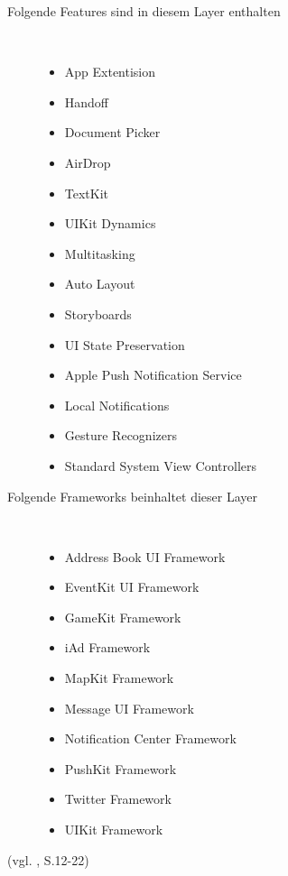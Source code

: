 \begin{description}
\item[Folgende Features sind in diesem Layer enthalten]~\par
	\begin{multicols}{2}
	\begin{itemize}
		\item App Extentision
		\item Handoff
		\item Document Picker
		\item AirDrop
		\item TextKit
		\item UIKit Dynamics
		\item Multitasking
		\item Auto Layout
		\item Storyboards
		\item UI State Preservation
		\item Apple Push Notification Service
		\item Local Notifications
		\item Gesture Recognizers
		\item Standard System View Controllers
         \end{itemize}
	\end{multicols}
\end{description}

\begin{description}
	\item[Folgende Frameworks beinhaltet dieser Layer]~\par
	\begin{multicols}{2}
	\begin{itemize}
		\item Address Book UI Framework
		\item EventKit UI Framework
		\item GameKit Framework
		\item iAd Framework
		\item MapKit Framework
		\item Message UI Framework
		\item Notification Center Framework
		\item PushKit Framework
		\item Twitter Framework
		\item UIKit Framework
         \end{itemize}
	\end{multicols}
\end{description}
(vgl. \cite{Apple[6]}, S.12-22)

